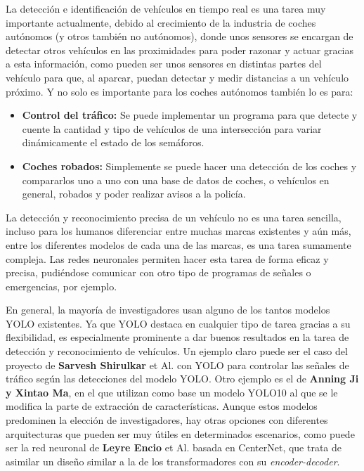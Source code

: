 \documentclass[11pt]{article}
\begin{document}
La detección e identificación de vehículos en tiempo real es una tarea muy importante actualmente, debido al crecimiento de la industria de coches autónomos (y otros también no autónomos), donde unos sensores se encargan de detectar otros vehículos en las proximidades para poder razonar y actuar gracias a esta información, como pueden ser unos sensores en distintas partes del vehículo para que, al aparcar, puedan detectar y medir distancias a un vehículo próximo. Y no solo es importante para los coches autónomos también lo es para:
\begin{itemize}
    \item \textbf{Control del tráfico:} Se puede implementar un programa para que detecte y cuente la cantidad y tipo de vehículos de una intersección para variar dinámicamente el estado de los semáforos.
    \item \textbf{Coches robados:} Simplemente se puede hacer una detección de los coches y compararlos uno a uno con una base de datos de coches, o vehículos en general, robados y poder realizar avisos a la policía.
\end{itemize}

La detección y reconocimiento precisa de un vehículo no es una tarea sencilla, incluso para los humanos diferenciar entre muchas marcas existentes y aún más, entre los diferentes modelos de cada una de las marcas, es una tarea sumamente compleja. Las redes neuronales permiten hacer esta tarea de forma eficaz y precisa, pudiéndose comunicar con otro tipo de programas de señales o emergencias, por ejemplo.

En general, la mayoría de investigadores usan alguno de los tantos modelos YOLO existentes. Ya que YOLO destaca en cualquier tipo de tarea gracias a su flexibilidad, es especialmente prominente a dar buenos resultados en la tarea de detección y reconocimiento de vehículos. Un ejemplo claro puede ser el caso del proyecto de \textbf{Sarvesh Shirulkar} et Al.\cite{ramzan2023enhancingvehicleentranceparking} con YOLO para controlar las señales de tráfico según las detecciones del modelo YOLO. Otro ejemplo es el de \textbf{Anning Ji y Xintao Ma}\cite{JI2025804}, en el que utilizan como base un modelo YOLO10 al que se le modifica la parte de extracción de características. Aunque estos modelos predominen la elección de investigadores, hay otras opciones con diferentes arquitecturas que pueden ser muy útiles en determinados escenarios, como puede ser la red neuronal de \textbf{Leyre Encio} et Al.\cite{articleEncio} basada en CenterNet, que trata de asimilar un diseño similar a la de los transformadores con su \textit{encoder-decoder}.
\end{document}
